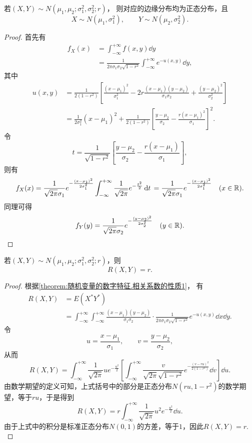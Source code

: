\begin{theorem}\label{theorem:正态分布与自然指数分布族.性质1}
若\((X,Y) \sim N(\mu_1,\mu_2;\sigma_1^2,\sigma_2^2;r)\)，
则对应的边缘分布均为正态分布，且\[
	X \sim N(\mu_1,\sigma_1^2),
	\qquad
	Y \sim N(\mu_2,\sigma_2^2).
\]
\begin{proof}
首先有
\begin{align*}
f_X(x) &= \int_{-\infty}^{+\infty} f(x,y) \dd{y} \\
&= \frac{1}{2\pi\sigma_1\sigma_2\sqrt{1-r^2}}
	\int_{-\infty}^{+\infty} e^{-u(x,y)} \dd{y},
\end{align*}
其中\begin{align*}
	u(x,y)
	&= \frac{1}{2(1-r^2)} \left[
			\frac{(x-\mu_1)^2}{\sigma_1^2}
			-2r\frac{(x-\mu_1)(y-\mu_2)}{\sigma_1\sigma_2}
			+\frac{(y-\mu_2)^2}{\sigma_2^2}
		\right] \\
	&= \frac{1}{2 \sigma_1^2} (x-\mu_1)^2
		+ \frac{1}{2(1-r^2)} \left[
			\frac{y-\mu_2}{\sigma_2}
			- \frac{r(x-\mu_1)^2}{\sigma_1}
		\right]^2.
\end{align*}
令\[
t = \frac{1}{\sqrt{1-r^2}} \left[
\frac{y-\mu_2}{\sigma_2}
- \frac{r(x-\mu_1)}{\sigma_1}
\right],
\]则有\[
f_X(x)
= \frac{1}{\sqrt{2\pi} \sigma_1} e^{-\frac{(x-\mu_1)^2}{2\sigma_1^2}} \int_{-\infty}^{+\infty} \frac{1}{\sqrt{2\pi}} e^{-\frac{t^2}{2}} \dd{t} \\
= \frac{1}{\sqrt{2\pi} \sigma_1} e^{-\frac{(x-\mu_1)^2}{2\sigma_1^2}}
\quad(x\in\mathbb{R}).
\]
同理可得\[
f_Y(y)
= \frac{1}{\sqrt{2\pi} \sigma_2} e^{-\frac{(y-\mu_2)^2}{2\sigma_2^2}}
\quad(y\in\mathbb{R}).
\qedhere
\]
\end{proof}
\end{theorem}

\begin{theorem}\label{theorem:正态分布与自然指数分布族.性质2}
若\((X,Y) \sim N(\mu_1,\mu_2;\sigma_1^2,\sigma_2^2;r)\)，则\[
R(X,Y) = r.
\]
\begin{proof}
根据\cref{theorem:随机变量的数字特征.相关系数的性质1}，
有\begin{align*}
	R(X,Y)
	&= E(X^* Y^*) \\
	&= \int_{-\infty}^{+\infty} \int_{-\infty}^{+\infty}
		\frac{(x-\mu_1)(y-\mu_2)}{\sigma_1 \sigma_2}
		\cdot
		\frac{1}{2\pi \sigma_1 \sigma_2 \sqrt{1-r^2}}
		e^{-u(x,y)}
		\dd{x} \dd{y}.
\end{align*}
{%
\def\u{u}%
\def\v{v}%
\def\intx{\int_{-\infty}^{+\infty}}%
令\[
	\u = \frac{x-\mu_1}{\sigma_1},
	\qquad
	\v = \frac{y-\mu_2}{\sigma_2},
\]从而\[
	R(X,Y)
	= \intx
		\frac{1}{\sqrt{2\pi}}
		\u e^{-\frac{\u^2}{2}}
		\left[
			\intx
			\frac{\v}{\sqrt{2\pi} \sqrt{1-r^2}}
			e^{-\frac{(\v-r\u)^2}{2(1-r^2)}}
			\dd{\v}
		\right]
		\dd{\u}.
\]
由数学期望的定义可知，上式括号中的部分是正态分布\(N(r\u,1-r^2)\)的数学期望，等于\(r\u\)，于是得到\[
	R(X,Y)
	= r \intx \frac{1}{\sqrt{2\pi}} \u^2 e^{-\frac{\u^2}{2}} \dd{\u}.
\]
由于上式中的积分是标准正态分布\(N(0,1)\)的方差，等于\(1\)，因此\(R(X,Y) = r\).
}%
\end{proof}
\end{theorem}

